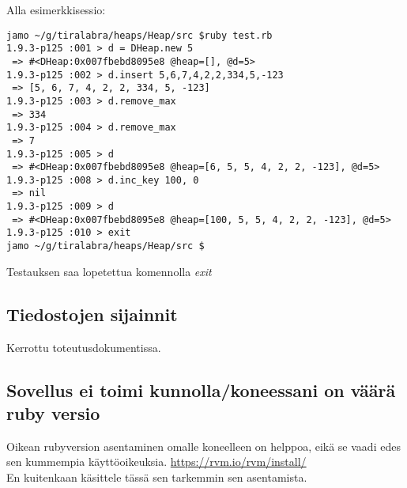 \documentclass[a4paper,12pt]{article}
\begin{document}
Alla esimerkkisessio:
\begin{verbatim}
jamo ~/g/tiralabra/heaps/Heap/src $ruby test.rb 
1.9.3-p125 :001 > d = DHeap.new 5
 => #<DHeap:0x007fbebd8095e8 @heap=[], @d=5> 
1.9.3-p125 :002 > d.insert 5,6,7,4,2,2,334,5,-123
 => [5, 6, 7, 4, 2, 2, 334, 5, -123] 
1.9.3-p125 :003 > d.remove_max
 => 334 
1.9.3-p125 :004 > d.remove_max
 => 7 
1.9.3-p125 :005 > d
 => #<DHeap:0x007fbebd8095e8 @heap=[6, 5, 5, 4, 2, 2, -123], @d=5> 
1.9.3-p125 :008 > d.inc_key 100, 0
 => nil 
1.9.3-p125 :009 > d
 => #<DHeap:0x007fbebd8095e8 @heap=[100, 5, 5, 4, 2, 2, -123], @d=5> 
1.9.3-p125 :010 > exit
jamo ~/g/tiralabra/heaps/Heap/src $
\end{verbatim}
Testauksen saa lopetettua komennolla \emph{exit}

\subsection{Tiedostojen sijainnit}
Kerrottu toteutusdokumentissa.

\subsection{Sovellus ei toimi kunnolla/koneessani on väärä ruby versio}
Oikean rubyversion asentaminen omalle koneelleen on helppoa, eikä se vaadi edes sen kummempia käyttöoikeuksia. \url{https://rvm.io/rvm/install/} \\
En kuitenkaan käsittele tässä sen tarkemmin sen asentamista.
\end{document}
